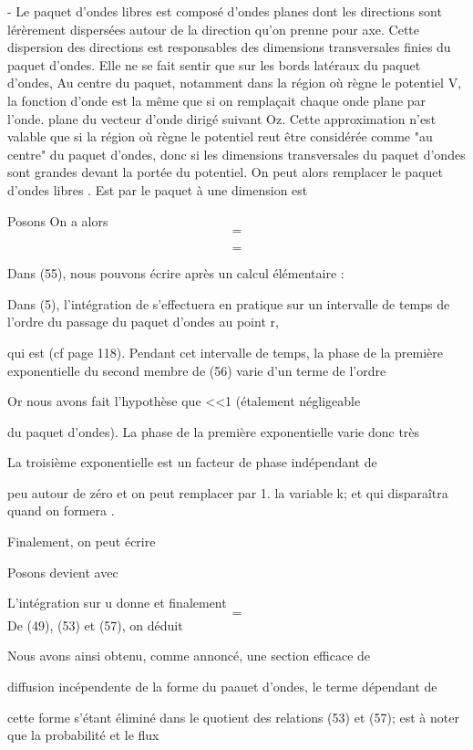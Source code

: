 {{{- Le paquet d'ondes libres  est composé d'ondes planes  dont
les directions sont lérèrement dispersées autour de la direction  qu'on
prenne pour axe. Cette dispersion des directions est responsables des
dimensions transversales finies du paquet d'ondes. Elle ne se fait sentir
que sur les bords latéraux du paquet d'ondes, Au centre du paquet, notamment
dans la région où règne le potentiel V, la fonction d'onde est la
même que si on remplaçait chaque onde plane  par l'onde. plane du
vecteur d'onde  dirigé suivant Oz. Cette approximation n'est valable que
si la région où règne le potentiel reut être considérée comme "au centre"
du paquet d'ondes, donc si les dimensions transversales du paquet d'ondes
sont grandes devant la portée du potentiel. On peut alors remplacer le paquet d'ondes libres . Est
par le paquet à une dimension est

Posons
On a alors
\[
\tag{55}=
\]

\[
\tag{56}=
\]


Dans (55), nous pouvons écrire après un calcul élémentaire :

Dans (5), l'intégration de  s'effectuera en pratique sur un
intervalle de temps de l'ordre du passage du paquet d'ondes au point r,

qui est (cf page 118).
Pendant cet intervalle de temps, la phase de la première exponentielle du
second membre de (56) varie d'un terme de l'ordre

Or nous avons fait l'hypothèse que <<1 (étalement négligeable

du paquet d'ondes). La phase de la première exponentielle varie donc très

La troisième exponentielle est un facteur de phase indépendant de

peu autour de zéro et on peut remplacer  par 1.
la variable k; et qui disparaîtra quand on formera .

Finalement, on peut écrire

Posons 
 devient  avec


L'intégration sur u donne 
et finalement
\[
\tag{57}=
\]
De (49), (53) et (57), on déduit

Nous avons ainsi obtenu, comme annoncé, une section efficace de

diffusion incépendente de la forme du paauet d'ondes, le terme dépendant de

cette forme  s'étant éliminé dans le quotient des relations
(53) et (57);  est à noter que la probabilité  et le flux

}}}
